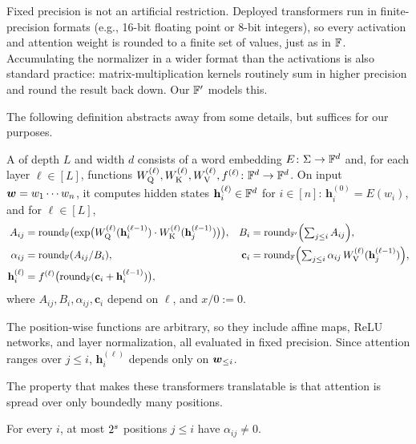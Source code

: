 \begin{remark}
Fixed precision is not an artificial restriction. Deployed transformers run in finite-precision formats
(e.g., 16-bit floating point or 8-bit integers), so every activation and attention weight is rounded to a
finite set of values, just as in $\mathbb{F}$. Accumulating the normalizer in a wider format than the activations is
also standard practice: matrix-multiplication kernels routinely sum in higher precision and round the result
back down. Our $\mathbb{F}'$ models this.
\end{remark}

The following definition abstracts away from some details, but suffices for our purposes.

\begin{definition} \label{def:transformer}
A  of depth $L$ and width $d$ consists of a word embedding $E\colon{{ \Sigma}}\to\mathbb{F}^d$ and,
for each layer $\ell\in[L]$, functions $W_{\textnormal{Q}}^{(\ell)},W_{\textnormal{K}}^{(\ell)},W_{\textnormal{V}}^{(\ell)},f^{(\ell)}\colon\mathbb{F}^d\to\mathbb{F}^d$.
On input ${{\boldsymbol{w}}}=w_1\cdots w_n$, it computes hidden states $\mathbf{h}^{(\ell)}_i\in\mathbb{F}^d$ for $i\in[n]$:
$\mathbf{h}^{(0)}_i = E(w_i)$, and for $\ell\in[L]$,
\begin{align}
A_{ij} &= \textnormal{round}_{\mathbb{F}}\bigl(\exp\bigl(W_{\textnormal{Q}}^{(\ell)}(\mathbf{h}^{(\ell-1)}_i)\cdot W_{\textnormal{K}}^{(\ell)}(\mathbf{h}^{(\ell-1)}_j)\bigr)\bigr), &
B_i &= \textnormal{round}_{\mathbb{F}'}\Bigl(\textstyle\sum_{j\leq i}A_{ij}\Bigr), \notag\\
\alpha_{ij} &= \textnormal{round}_{\mathbb{F}}(A_{ij}/B_i), &
\mathbf{c}_i &= \textnormal{round}_{\mathbb{F}}\Bigl(\textstyle\sum_{j\leq i}\alpha_{ij}\,W_{\textnormal{V}}^{(\ell)}(\mathbf{h}^{(\ell-1)}_j)\Bigr), \label{eq:attention}\\
\mathbf{h}^{(\ell)}_i &= f^{(\ell)}\bigl(\textnormal{round}_{\mathbb{F}}(\mathbf{c}_i+\mathbf{h}^{(\ell-1)}_i)\bigr), \notag
\end{align}
where $A_{ij},B_i,\alpha_{ij},\mathbf{c}_i$ depend on $\ell$, and $x/0:=0$.
\end{definition}

The position-wise functions are arbitrary, so they include affine maps, ReLU networks, and layer
normalization, all evaluated in fixed precision. Since attention ranges over $j\leq i$,
$\mathbf{h}^{(\ell)}_i$ depends only on ${{\boldsymbol{w}}}_{\leq i}$.

The property that makes these transformers translatable is that attention is spread over only
boundedly many positions.

\begin{lemma} \label{lem:bounded_support}
For every $i$, at most $2^{{s}}$ positions $j\leq i$ have $\alpha_{ij}\neq0$.
\end{lemma}

